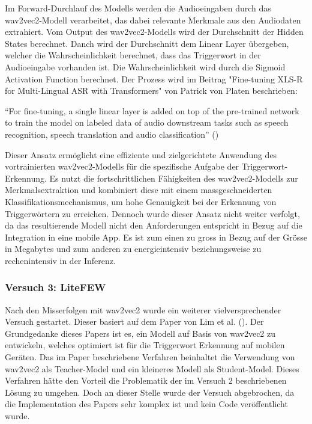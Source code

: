 \documentclass[11pt,a4paper]{article}
\begin{document}
\noindent \newline
Im Forward-Durchlauf des Modells werden die Audioeingaben durch das wav2vec2-Modell verarbeitet, 
das dabei relevante Merkmale aus den Audiodaten extrahiert. Vom Output des wav2vec2-Modells wird 
der Durchschnitt der Hidden States berechnet. Danch wird der Durchschnitt dem Linear Layer 
übergeben, welcher die Wahrscheinlichkeit berechnet, dass das Triggerwort in der Audioeingabe
vorhanden ist. Die Wahrscheinlichkeit wird durch die Sigmoid Activation Function berechnet. Der 
Prozess wird im Beitrag "Fine-tuning XLS-R for Multi-Lingual ASR with Transformers" von Patrick 
von Platen beschrieben:

\begin{displayquote}
	``For fine-tuning, a single linear layer is added on top of the pre-trained network to train 
	the model on labeled data of audio downstream tasks such as speech recognition, speech 
	translation and audio classification'' 
	(\cite{platen2021finetune})
\end{displayquote}

\noindent \newline
Dieser Ansatz ermöglicht eine effiziente und zielgerichtete Anwendung des vortrainierten 
wav2vec2-Modells für die spezifische Aufgabe der Triggerwort-Erkennung. Es nutzt die 
fortschrittlichen Fähigkeiten des wav2vec2-Modells zur Merkmalsextraktion und kombiniert 
diese mit einem massgeschneiderten Klassifikationsmechanismus, um hohe Genauigkeit bei der 
Erkennung von Triggerwörtern zu erreichen. Dennoch wurde dieser Ansatz nicht weiter verfolgt, da 
das resultierende Modell nicht den Anforderungen entspricht in Bezug auf die Integration in eine 
mobile App. Es ist zum einen zu gross in Bezug auf der Grösse in Megabytes und zum anderen zu 
energieintensiv beziehungsweise zu rechenintensiv in der Inferenz. 



\subsubsection{Versuch 3: LiteFEW}
Nach den Misserfolgen mit wav2vec2 wurde ein weiterer vielversprechender Versuch gestartet. Dieser 
basiert auf dem Paper von Lim et al. (\cite{lim2023lightweight}). Der Grundgedanke dieses Papers 
ist es, ein Modell auf Basis von wav2vec2 zu entwickeln, welches optimiert ist für die Triggerwort 
Erkennung auf mobilen Geräten. Das im Paper beschriebene Verfahren beinhaltet die Verwendung von 
wav2vec2 als Teacher-Model und ein kleineres Modell als Student-Model. Dieses Verfahren hätte 
den Vorteil die Problematik der im Versuch 2 beschriebenen Lösung zu umgehen. Doch an dieser Stelle 
wurde der Versuch abgebrochen, da die Implementation des Papers sehr komplex ist und kein Code 
veröffentlicht wurde.
\end{document}
